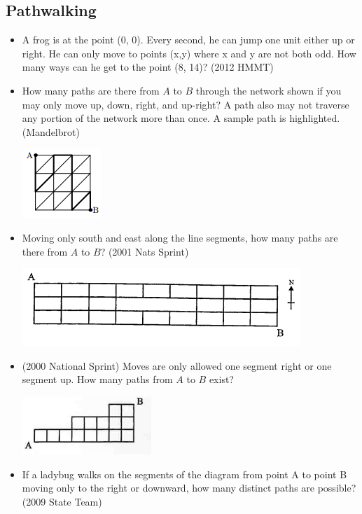 \documentclass{article}
\begin{document}
\subsection{Pathwalking}

\begin{itemize}

\item A frog is at the point (0, 0). Every second, he can jump one unit either up or right. He can only move
to points (x,y) where x and y are not both odd. How many ways can he get to the point (8, 14)? (2012 HMMT)

\item How many paths are there from $A$ to $B$ through the network shown if you may only move up, down, right, and up-right? A path also may not traverse any portion of the network more than once. A sample path is highlighted. (Mandelbrot)

\centerline{\includegraphics{MbrotC3.png}}

\item Moving only south and east along the line segments, how many paths are there from $A$ to $B$? (2001 Nats Sprint)

\centerline{\includegraphics{2001Nats.png}}

\item (2000 National Sprint) Moves are only allowed one segment right or one segment up. How many paths from $A$ to $B$ exist?

\centerline{\includegraphics{Pathwalking.png}}

\item If a ladybug walks on the segments of the diagram from point A to point B moving only to the right or downward, how many distinct paths are possible? (2009 State Team)


\end{itemize}
\end{document}
